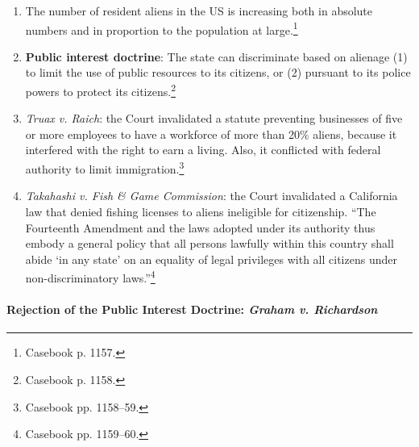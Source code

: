 \begin{enumerate}
    \item The number of resident aliens in the US is increasing both in 
    absolute numbers and in proportion to the population at 
    large.\footnote{Casebook p. 1157.}
    \item \textbf{Public interest doctrine}: The state can discriminate based 
    on alienage (1) to limit the use of public resources to its citizens, or 
    (2) pursuant to its police powers to protect its 
    citizens.\footnote{Casebook p. 1158.}
    \item \emph{Truax v. Raich}: the Court invalidated a statute preventing 
    businesses of five or more employees to have a workforce of more than 20\% 
    aliens, because it interfered with the right to earn a living. Also, it 
    conflicted with federal authority to limit immigration.\footnote{Casebook 
    pp. 1158--59.}
    \item \emph{Takahashi v. Fish \& Game Commission}: the Court invalidated a 
    California law that denied fishing licenses to aliens ineligible for 
    citizenship. ``The Fourteenth Amendment and the laws adopted under its 
    authority thus embody a general policy that all persons lawfully within 
    this country shall abide `in any state' on an equality of legal privileges 
    with all citizens under non-discriminatory laws.''\footnote{Casebook pp. 
    1159--60.}
\end{enumerate}

\paragraph{Rejection of the Public Interest Doctrine: \emph{Graham v. 
Richardson}}

